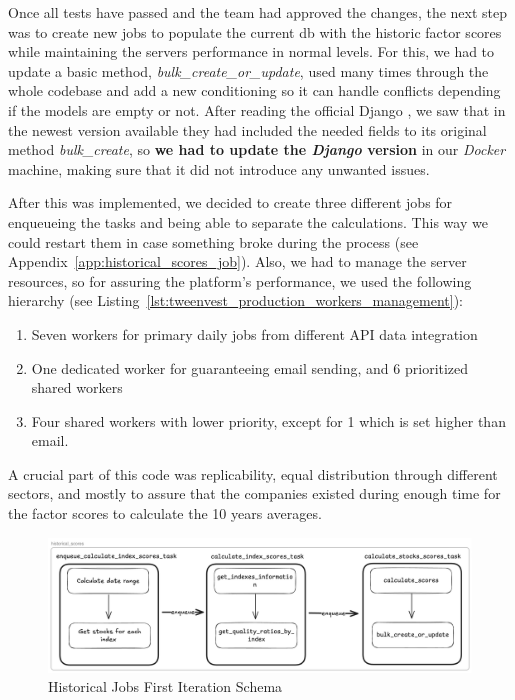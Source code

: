 \documentclass[11pt,english,a4paper,hidelinks]{book}
\begin{document}
Once all tests have passed and the team had approved the changes, the next step was to create new \acrshort{job}s to populate the current \acrshort{db} with the historic factor scores while maintaining the servers performance in normal levels. For this, we had to update a basic method, \textit{bulk\_create\_or\_update}, used many times through the whole codebase and add a new conditioning so it can handle conflicts depending if the models are empty or not. After reading the official Django \textcite{django2025queryset}, we saw that in the newest version available they had included the needed fields to its original method \textit{bulk\_create}, so \textbf{we had to update the \textit{Django} version} in our \textit{Docker} machine, making sure that it did not introduce any unwanted issues.

\vspace{0.5cm}
\noindent After this was implemented, we decided to create three different jobs for enqueueing the tasks and being able to separate the calculations. This way we could restart them in case something broke during the process (see Appendix~\ref{app:historical_scores_job}). Also, we had to manage the server resources, so for assuring the platform's performance, we used the following hierarchy (see Listing~\ref{lst:tweenvest_production_workers_management}):
\begin{enumerate}
    \item Seven workers for primary daily jobs from different API data integration
    \item One dedicated worker for guaranteeing email sending, and 6 prioritized shared workers
    \item Four shared workers with lower priority, except for 1 which is set higher than email.
\end{enumerate}

\vspace{0.5cm}
\noindent A crucial part of this code was replicability, equal distribution through different sectors, and mostly to assure that the companies existed during enough time for the factor scores to calculate the 10 years averages.
\begin{figure}[H]
    \centering
    \includegraphics[width=1\textwidth]{images/tweenvest/Historical Jobs First Iteration.png}
    \caption{Historical Jobs First Iteration Schema}
    \label{fig:historical_jobs_first_iteration}
\end{figure}
\end{document}
